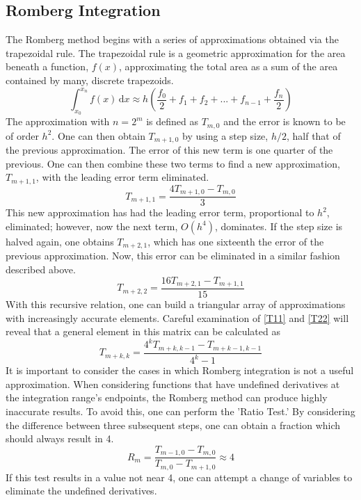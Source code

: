 \documentclass[12pt]{article}
\begin{document}
\subsection{Romberg Integration}
The Romberg method begins with a series of approximations obtained via the trapezoidal rule.  The trapezoidal rule is a geometric approximation for the area beneath a function, $f(x)$, approximating the total area as a sum of the area contained by many, discrete trapezoids.    
\begin{equation}
\label{trap}
\int_{x_0}^{x_n} \! f(x) \, \mathrm{d} x \approx h (\frac{f_0}{2} + f_1+f_2+...+f_{n-1}+\frac{f_n}{2})
\end{equation}
The approximation with $n=2^m$ is defined as $T_{m,0}$ and the error is known to be of order $h^2$.  One can then obtain $T_{m+1,0}$ by using a step size, $h/2$, half that of the previous approximation.    The error of this new term is one quarter of the previous.  One can then combine these two terms to find a new approximation, $T_{m+1,1}$, with the leading error term eliminated.
\begin{equation}
\label{T11}
T_{m+1,1} = \frac{4T_{m+1,0}-T_{m,0}}{3}
\end{equation}
This new approximation has had the leading error term, proportional to $h^2$, eliminated; however, now the next term, $O(h^4)$, dominates.  If the step size is halved again, one obtains $T_{m+2,1}$, which has one sixteenth the error of the previous approximation.  Now, this error can be eliminated in a similar fashion described above.
\begin{equation}
\label{T22}
T_{m+2,2} = \frac{16T_{m+2,1}-T_{m+1,1}}{15}
\end{equation}
With this recursive relation, one can build a triangular array of approximations with increasingly accurate elements.  Careful examination of \eqref{T11} and \eqref{T22} will reveal that a general element in this matrix can be calculated as
\begin{equation}
\label{Tkk}
T_{m+k,k} = \frac{4^kT_{m+k,k-1}-T_{m+k-1,k-1}}{4^k-1}
\end{equation}
It is important to consider the cases in which Romberg integration is not a useful approximation.  When considering functions that have undefined derivatives at the integration range's endpoints, the Romberg method can produce highly inaccurate results.  To avoid this, one can perform the 'Ratio Test.'  By considering the difference between three subsequent steps, one can obtain a fraction which should always result in 4.
 \begin{equation}
\label{Rm}
R_m = \frac{T_{m-1,0}-T_{m,0}}{T_{m,0}-T_{m+1,0}} \approx 4
\end{equation}
If this test results in a value not near 4, one can attempt a change of variables to eliminate the undefined derivatives.  
\end{document}
